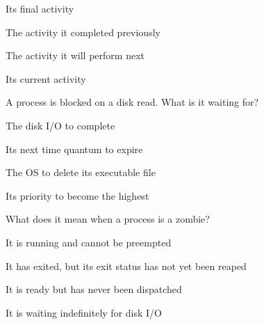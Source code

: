 \begin{questions}
\begin{verticalchoices}
\item Its final activity
\item The activity it completed previously
\item The activity it will perform next
\item Its current activity
\end{verticalchoices}
\question A process is blocked on a disk read. What is it waiting for?
\begin{verticalchoices}
\item The disk I/O to complete
\item Its next time quantum to expire
\item The OS to delete its executable file
\item Its priority to become the highest
\end{verticalchoices}
\question What does it mean when a process is a zombie?
\begin{verticalchoices}
\item It is running and cannot be preempted
\item It has exited, but its exit status has not yet been reaped
\item It is ready but has never been dispatched
\item It is waiting indefinitely for disk I/O
\end{verticalchoices}
\end{questions}\vfill\newpage
